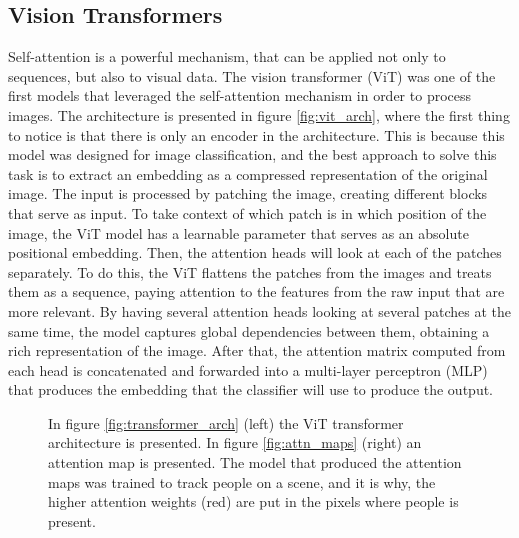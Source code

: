 \subsection{Vision Transformers}
\label{sec:vis-transformers}
Self-attention is a powerful mechanism, that can be applied not only to sequences, but also to visual data. The vision transformer (ViT) \cite{vit} was one of the first models that leveraged the self-attention mechanism in order to process images. The architecture is presented in figure \ref{fig:vit_arch}, where the first thing to notice is that there is only an encoder in the architecture. This is because this model was designed for image classification, and the best approach to solve this task is to extract an embedding as a compressed representation of the original image. The input is processed by patching the image, creating different blocks that serve as input. To take context of which patch is in which position of the image, the ViT model has a learnable parameter that serves as an absolute positional embedding. Then, the attention heads will look at each of the patches separately. To do this, the ViT flattens the patches from the images and treats them as a sequence, paying attention to the features from the raw input that are more relevant. By having several attention heads looking at several patches at the same time, the model captures global dependencies between them, obtaining a rich representation of the image. After that, the attention matrix computed from each head is concatenated and forwarded into a multi-layer perceptron (MLP) that produces the embedding that the classifier will use to produce the output.

\begin{figure}[!h] 
	\centering
	\hfill%
	\caption{In figure \ref{fig:transformer_arch} (left) the ViT transformer architecture is presented. In figure \ref{fig:attn_maps} (right) an attention map is presented. The model that produced the attention maps was trained to track people on a scene, and it is why, the higher attention weights (red) are put in the pixels where people is present.}
\end{figure}


